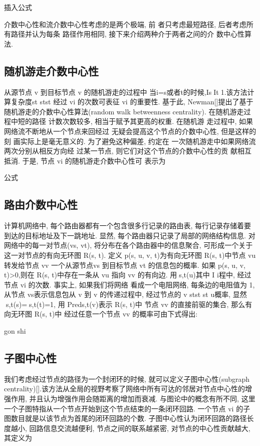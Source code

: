 			插入公式

			介数中心性和流介数中心性考虑的是两个极端, 前 者只考虑最短路径, 后者考虑所有路径并认为每条 路径作用相同, 接下来介绍两种介于两者之间的介 数中心性算法.

\subsection{随机游走介数中心性}
	从源节点 v 到目标节点 v 的随机游走的过程中 当i=s或者t的时候,IsIt1.该方法计算复杂度st stst 经过 vi 的次数可表征 vi 的重要性. 基于此, Newman[]提出了基于随机游走的介数中心性算法(random walk betweenness centrality). 在随机游走过程中短的路径 计数次数较多, 相当于赋予其更高的权重. 在随机游 走过程中, 如果网络流不断地从一个节点来回经过 无疑会提高这个节点的介数中心性, 但是这样的刻 画实际上是毫无意义的. 为了避免这种偏差, 约定在 一次随机游走中如果网络流两次分别从相反方向经 过某一节点, 则它们对这个节点的介数中心性的贡 献相互抵消. 于是, 节点 vi 的随机游走介数中心性可 表示为

			公式
\subsection{路由介数中心性}
计算机网络中, 每个路由器都有一个包含很多行记录的路由表, 每行记录存储着要到达的目标地址及下一跳地址. 显然, 每个路由器只记录了局部的网络结构信息. 对网络中的每一对节点(vs, vt), 将分布在各个路由器中的信息聚合, 可形成一个关于这一对节点的有向无环图 R(s, t). 定义 p(s, u, v, t)为有向无环图 R(s, t)中节点 vu 转发给节点 vv 一个从源节点vs 到目标节点 vt 的信息包的概率. 如果 p(s, u, v, t)>0,则在 R(s, t)中存在一条从 vu 指向 vv 的有向边. 用s,t(u)其中 I i程中, 经过节点 vi 的次数. 事实上, 如果我们将网络 看成一个电阻网络, 每条边的电阻值为 1, 从节点 vs表示信息包从 v 到 v 的传递过程中, 经过节点的 v stst st u概率, 显然s,t(s)=s,t(t)=1, 用 Preds,t(v)表示 R(s, t)中 节点 vv 的直接前驱的集合, 那么有向无环图 R(s, t)中 经过任意一个节点 vv 的概率可由下式得出:

gon shi
\subsection{子图中心性}
我们考虑经过节点的路径为一个封闭环的时候, 就可以定义子图中心性(subgraph centrality)[].该方法从全局的视野考察了网络中所有可达的邻居对节点中心性的增强作用, 并且认为增强作用会随距离的增加而衰减. 与图论中的概念有所不同, 这里一个子图特指从一个节点开始到这个节点结束的一条闭环回路. 一个节点 vi 的子图数目就是以该节点为首尾的闭环回路的个数. 子图中心性认为闭环回路的路径长度越小, 回路信息交流越便利, 节点之间的联系越紧密, 对节点的中心性贡献越大, 其定义为

